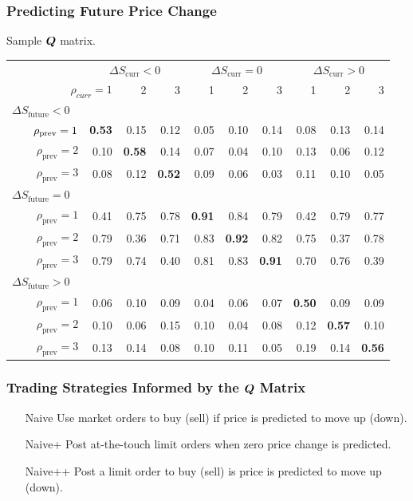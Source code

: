 \begin{frame}
\frametitle{Predicting Future Price Change}
Sample $\boldsymbol{Q}$ matrix.
\begin{table}%
%
\begin{adjustbox}{width=\textwidth}
\begin{tabular}{@{} r@{\hskip 1cm} *{9}{r} @{}}%
\toprule
& \multicolumn{3}{c}{$\Delta S_\text{curr} < 0$} & \multicolumn{3}{c}{$\Delta S_\text{curr} = 0$} & \multicolumn{3}{c}{$\Delta S_\text{curr} > 0$} \\
\cmidrule(lr){2-4} \cmidrule(lr){5-7} \cmidrule(lr){8-10}
\multicolumn{2}{r}{$\rho_{curr} = 1$} & 2 & 3 & 1 & 2 & 3 & 1 & 2 & 3 \\
\midrule
\multicolumn{10}{l}{$\Delta S_\text{future} < 0$} \\
$\hphantom{abcd}\rho_\text{prev} = 1$ & \bf 0.53 & 0.15 & 0.12 & 0.05 & 0.10 & 0.14 & 0.08 & 0.13 & 0.14 \\
$\rho_\text{prev} = 2$ & 0.10 & \bf 0.58 & 0.14 & 0.07 & 0.04 & 0.10 & 0.13 & 0.06 & 0.12 \\
$\rho_\text{prev} = 3$ & 0.08 & 0.12 & \bf 0.52 & 0.09 & 0.06 & 0.03 & 0.11 & 0.10 & 0.05 \\[0.6ex]
\multicolumn{10}{l}{$\Delta S_\text{future} = 0$} \\
$\rho_\text{prev} = 1$ & 0.41 & 0.75 & 0.78 & \bf 0.91 & 0.84 & 0.79 & 0.42 & 0.79 & 0.77 \\
$\rho_\text{prev} = 2$ & 0.79 & 0.36 & 0.71 & 0.83 & \bf 0.92 & 0.82 & 0.75 & 0.37 & 0.78 \\
$\rho_\text{prev} = 3$ & 0.79 & 0.74 & 0.40 & 0.81 & 0.83 & \bf 0.91 & 0.70 & 0.76 & 0.39 \\[0.6ex]
\multicolumn{10}{l}{$\Delta S_\text{future} > 0$} \\
$\rho_\text{prev} = 1$ & 0.06 & 0.10 & 0.09 & 0.04 & 0.06 & 0.07 & \bf 0.50 & 0.09 & 0.09 \\
$\rho_\text{prev} = 2$ & 0.10 & 0.06 & 0.15 & 0.10 & 0.04 & 0.08 & 0.12 & \bf 0.57 & 0.10 \\
$\rho_\text{prev} = 3$ & 0.13 & 0.14 & 0.08 & 0.10 & 0.11 & 0.05 & 0.19 & 0.14 & \bf 0.56 \\
\bottomrule
\end{tabular}%
\end{adjustbox}%
\end{table}%
\end{frame}

\begin{frame}
\frametitle{Trading Strategies Informed by the $\boldsymbol{Q}$ Matrix}
\setlength{\leftmargini}{50pt}
\begin{itemize}
\item[Naive] Use market orders to buy (sell) if price is predicted to move up (down).
\item[Naive+] Post at-the-touch limit orders when zero price change is predicted.
\item[Naive++] Post a limit order to buy (sell) is price is predicted to move up (down).
\end{itemize}
\end{frame}


